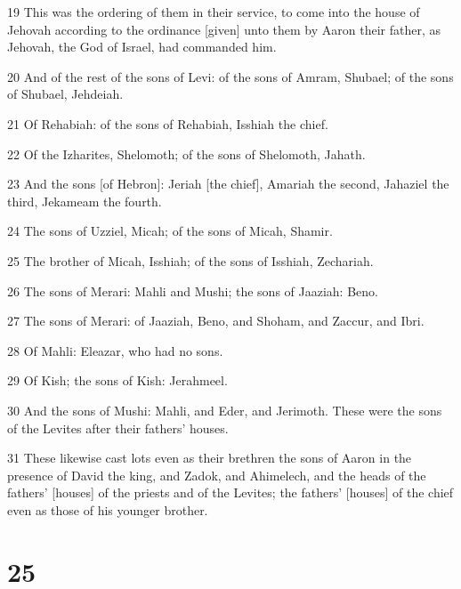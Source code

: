 \par 19 This was the ordering of them in their service, to come into the house of Jehovah according to the ordinance [given] unto them by Aaron their father, as Jehovah, the God of Israel, had commanded him.
\par 20 And of the rest of the sons of Levi: of the sons of Amram, Shubael; of the sons of Shubael, Jehdeiah.
\par 21 Of Rehabiah: of the sons of Rehabiah, Isshiah the chief.
\par 22 Of the Izharites, Shelomoth; of the sons of Shelomoth, Jahath.
\par 23 And the sons [of Hebron]: Jeriah [the chief], Amariah the second, Jahaziel the third, Jekameam the fourth.
\par 24 The sons of Uzziel, Micah; of the sons of Micah, Shamir.
\par 25 The brother of Micah, Isshiah; of the sons of Isshiah, Zechariah.
\par 26 The sons of Merari: Mahli and Mushi; the sons of Jaaziah: Beno.
\par 27 The sons of Merari: of Jaaziah, Beno, and Shoham, and Zaccur, and Ibri.
\par 28 Of Mahli: Eleazar, who had no sons.
\par 29 Of Kish; the sons of Kish: Jerahmeel.
\par 30 And the sons of Mushi: Mahli, and Eder, and Jerimoth. These were the sons of the Levites after their fathers' houses.
\par 31 These likewise cast lots even as their brethren the sons of Aaron in the presence of David the king, and Zadok, and Ahimelech, and the heads of the fathers' [houses] of the priests and of the Levites; the fathers' [houses] of the chief even as those of his younger brother.

\chapter{25}

